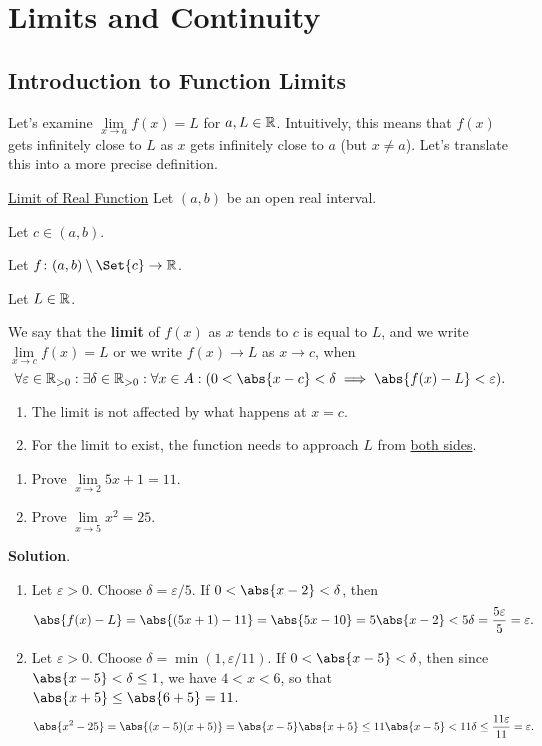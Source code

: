 \chapter{Limits and Continuity}
\section{Introduction to Function Limits}
Let's examine $ \lim\limits_{{x} \to {a}}f(x)=L $ for $ a,L\in\mathbb{R} $.
Intuitively, this means that $ f(x) $ gets infinitely close to $ L $
as $ x $ gets infinitely close to $ a $ (but $ x\ne a $). Let's translate this
into a more precise definition.
\begin{Definition}{\href{https://proofwiki.org/wiki/Definition:Limit_of_Real_Function}{Limit of Real Function}}{}
    Let $ (a,b) $ be an open real interval.\smallskip

    Let $ c\in(a,b) $.\smallskip

    Let $ f\colon (a,b)\setminus\Set{c}\to\R $.\smallskip

    Let $ L\in\mathbb{R} $.\smallskip

    We say that the \textbf{limit} of $ f(x) $ as $ x $ tends to $ c $ is equal to $ L $,
    and we write $ \lim\limits_{{x} \to {c}}f(x)=L $ or we write $ f(x)\to L $ as $ x\to c $, when
    \[ \forall \varepsilon\in\R_{>0}:\exists \delta\in\R_{>0}:\forall x\in A: (0<\abs{x-c}<\delta\implies \abs{f(x)-L}<\varepsilon). \]
\end{Definition}
\begin{Remark}{}{}
    \begin{enumerate}[(1)]
        \item The limit is not affected by what happens at $ x=c $.
        \item For the limit to exist, the function needs to approach $ L $ from \underline{both sides}.
    \end{enumerate}
\end{Remark}
\begin{Example}{}{}
    \begin{enumerate}[(1)]
        \item Prove $ \lim\limits_{{x} \to {2}}5x+1=11 $.
        \item Prove $ \lim\limits_{{x} \to {5}}x^2=25 $.
    \end{enumerate}
    \tcblower{}
    \textbf{Solution}.
    \begin{enumerate}[(1)]
        \item Let $ \varepsilon>0 $. Choose $ \delta=\varepsilon/5 $. If $ 0<\abs{x-2}<\delta $, then
              \[ \abs{f(x)-L}=\abs{(5x+1)-11}=\abs{5x-10}=5\abs{x-2}<5\delta=\frac{5\varepsilon}{5}=\varepsilon. \]
        \item Let $ \varepsilon>0 $. Choose $ \delta=\min(1,\varepsilon/11) $. If $ 0<\abs{x-5}<\delta $, then
              since $ \abs{x-5}<\delta\le 1 $, we have $ 4<x<6 $, so that
              $ \abs{x+5}\le \abs{6+5}=11 $.
              \[ \abs{x^2-25}=\abs{(x-5)(x+5)}=\abs{x-5}\abs{x+5}\le 11\abs{x-5}<11\delta\le \frac{11\varepsilon}{11}=\varepsilon. \]
    \end{enumerate}
\end{Example}
